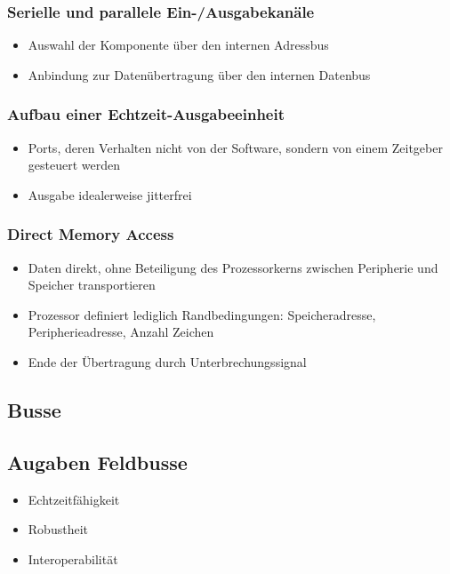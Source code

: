 \subsubsection{Serielle und parallele Ein-/Ausgabekanäle}
\begin{itemize}
	\item Auswahl der Komponente über den internen Adressbus
	\item Anbindung zur Datenübertragung über den internen Datenbus
\end{itemize}

\subsubsection{Aufbau einer Echtzeit-Ausgabeeinheit}
\begin{itemize}
	\item Ports, deren Verhalten nicht von der Software, sondern von einem Zeitgeber gesteuert werden
	\item Ausgabe idealerweise jitterfrei
\end{itemize}

\subsubsection{Direct Memory Access}
\begin{itemize}
	\item Daten direkt, ohne Beteiligung des Prozessorkerns zwischen Peripherie und Speicher transportieren
	\item Prozessor definiert lediglich Randbedingungen: Speicheradresse, Peripherieadresse, Anzahl Zeichen
	\item Ende der Übertragung durch Unterbrechungssignal
\end{itemize}


\subsection{Busse}


\subsection{Augaben Feldbusse}
\begin{itemize}
	\item Echtzeitfähigkeit
	\item Robustheit
	\item Interoperabilität
\end{itemize}


